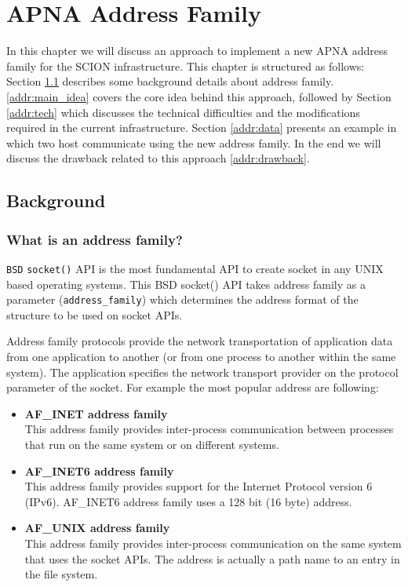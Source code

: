
\chapter{APNA Address Family} %

\label{address_family}
In this chapter we will discuss an approach to implement a new APNA address family for the SCION infrastructure. This chapter is structured as follows: Section \ref{addr:background} describes some background details about address family. \ref{addr:main_idea} covers the core idea behind this approach, followed by Section \ref{addr:tech} which discusses the technical difficulties and the modifications required in the current infrastructure. Section \ref{addr:data} presents an example in which two host communicate using the new address family. In the end we will discuss the drawback related to this approach \ref{addr:drawback}. 

\section{Background} \label{addr:background}
\subsection{What is an address family?}
\texttt{BSD} \texttt{socket()} API is the most fundamental API to create socket in any UNIX based operating systems. This BSD socket() API takes address family as a parameter (\texttt{address\_family}) which determines the address format of the structure to be used on socket APIs.

Address family protocols provide the network transportation of application data from one application to another (or from one process to another within the same system). The application specifies the network transport provider on the protocol parameter of the socket. For example the most popular address are following:
\begin{itemize}
    \item \textbf{AF\_INET address family} \\
    This address family provides inter-process communication between processes that run on the same system or on different systems.
    \item \textbf{AF\_INET6 address family} \\
    This address family provides support for the Internet Protocol version 6 (IPv6). AF\_INET6 address family uses a 128 bit (16 byte) address.
    \item \textbf{AF\_UNIX address family} \\
    This address family provides inter-process communication on the same system that uses the socket APIs. The address is actually a path name to an entry in the file system.
\end{itemize}

